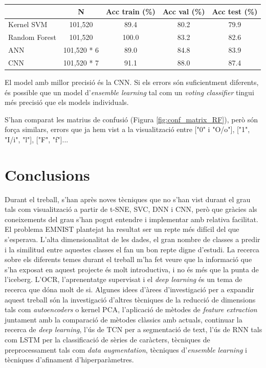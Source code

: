 \documentclass[12pt, spanish]{article}
\begin{document}
\begin{table}[hbt!]
\centering
\begin{tabular}{lcccc}  
\toprule
                                              & N              & Acc train (\%) & Acc val (\%) & Acc test (\%)\\  
\midrule
Kernel SVM                             & 101,520      &  89.4            & 80.2               & 79.9\\
Random Forest                        & 101,520      & 100.0           & 83.2               & 82.6\\
ANN 				             & 101,520 * 6 & 89.0             &  84.8              & 83.9 \\
CNN					     & 101,520 * 7 & 91.1             &  88.0              &  87.4 \\
\bottomrule
\end{tabular}
\label{tab:taula3}
\end{table}


El model amb millor precisió és la CNN. Si els errors són suficientment diferents, és possible que un model d'\textit{ensemble learning} tal com un \textit{voting classifier} tingui més precisió que els models individuals. 

S'han comparat les matrius de confusió (Figura \ref{fig:conf_matrix_RF}), però són força similars, errors que ja hem vist a la visualització entre ["0" i "O/o"], ["1", "I/i", "l"], ["F", "f"]...




\section{Conclusions}

Durant el treball, s'han après noves tècniques que no s'han vist durant el grau tals com visualització a partir de t-SNE, SVC, DNN i CNN, però que gràcies als coneixements del grau s'han pogut entendre i implementar amb relativa facilitat. El problema EMNIST plantejat ha resultat ser un repte més difícil del que s'esperava. L'alta dimensionalitat de les dades, el gran nombre de classes a predir i la similitud entre aquestes classes el fan un bon repte digne d'estudi.  La recerca sobre els diferents temes durant el treball m'ha fet veure que la informació que s'ha exposat en aquest projecte és molt introductiva, i no és més que la punta de l'iceberg. L'OCR, l'aprenentatge supervisat i el \textit{deep learning} és un tema de recerca que dóna molt de si. Algunes idees d'àrees d'investigació per a expandir aquest treball són la investigació d'altres tècniques de la  reducció de dimensions tals com \textit{autoencoders} o kernel PCA, l'aplicació de mètodes de \textit{feature extraction} juntament amb la comparació de mètodes clàssics amb actuals, continuar la recerca de \textit{deep learning}, l'ús de TCN per a segmentació de text, l'ús de RNN tals com LSTM per la classificació de sèries de caràcters, tècniques de preprocessament tals com \textit{data augmentation}, tècniques d'\textit{ensemble learning} i tècniques d'afinament d'hiperparàmetres.
\end{document}
